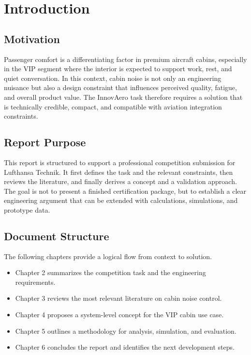 \chapter{Introduction}

\section{Motivation}
Passenger comfort is a differentiating factor in premium aircraft cabins, especially in the VIP segment where the interior is expected to support work, rest, and quiet conversation. In this context, cabin noise is not only an engineering nuisance but also a design constraint that influences perceived quality, fatigue, and overall product value. The InnovAero task therefore requires a solution that is technically credible, compact, and compatible with aviation integration constraints.

\section{Report Purpose}
This report is structured to support a professional competition submission for Lufthansa Technik. It first defines the task and the relevant constraints, then reviews the literature, and finally derives a concept and a validation approach. The goal is not to present a finished certification package, but to establish a clear engineering argument that can be extended with calculations, simulations, and prototype data.

\section{Document Structure}
The following chapters provide a logical flow from context to solution.
\begin{itemize}
    \item Chapter 2 summarizes the competition task and the engineering requirements.
    \item Chapter 3 reviews the most relevant literature on cabin noise control.
    \item Chapter 4 proposes a system-level concept for the VIP cabin use case.
    \item Chapter 5 outlines a methodology for analysis, simulation, and evaluation.
    \item Chapter 6 concludes the report and identifies the next development steps.
\end{itemize}
